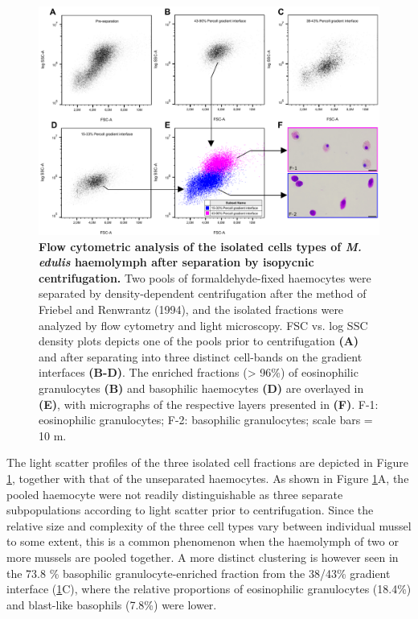 \begin{figure}[!ht]
    \centering
    \includegraphics[width=1.0\textwidth]{figures/Method development/PERCOLL SEP II.pdf}
    \caption{\textbf{Flow cytometric analysis of the isolated cells types of \emph{M. edulis} haemolymph after separation by isopycnic centrifugation.} Two pools of formaldehyde-fixed haemocytes were separated by density-dependent centrifugation after the method of Friebel and Renwrantz (1994), and the isolated fractions were analyzed by flow cytometry and light microscopy. FSC vs. log SSC density plots depicts one of the pools prior to centrifugation \textbf{(A)} and after separating into three distinct cell-bands on the gradient interfaces \textbf{(B-D)}. The enriched fractions (> 96\%) of eosinophilic granulocytes \textbf{(B)} and basophilic haemocytes \textbf{(D)} are overlayed in \textbf{(E)}, with micrographs of the respective layers presented in \textbf{(F)}. F-1: eosinophilic granulocytes; F-2: basophilic granulocytes; scale bars = 10 \micro m. }
    \label{fig:Percoll-dotplots}
\end{figure}

The light scatter profiles of the three isolated cell fractions are depicted in Figure \ref{fig:Percoll-dotplots}, together with that of the unseparated haemocytes. As shown in Figure \ref{fig:Percoll-dotplots}A, the pooled haemocyte were not readily distinguishable as three separate subpopulations according to light scatter prior to centrifugation. Since the relative size and complexity of the three cell types vary between individual mussel to some extent, this is a common phenomenon when the haemolymph of two or more mussels are pooled together. A more distinct clustering is however seen in the 73.8 \% basophilic granulocyte-enriched fraction from the 38/43\% gradient interface (\ref{fig:Percoll-dotplots}C), where the relative proportions of eosinophilic granulocytes (18.4\%) and blast-like basophils (7.8\%) were lower.

